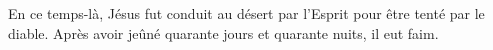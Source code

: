 En ce temps-là, Jésus fut conduit au désert par l’Esprit
	pour être tenté par le diable.
Après avoir jeûné quarante jours et quarante nuits, il eut faim.
